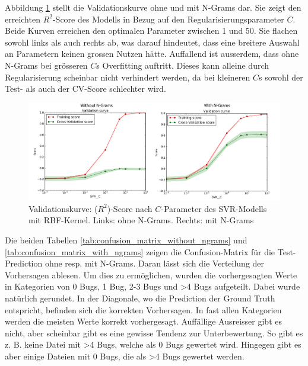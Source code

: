 \documentclass[10pt, a4paper]{article}
\begin{document}
Abbildung \ref{fig:svr_rbf_validation_curves} stellt die Validationskurve ohne und mit N-Grams dar. Sie zeigt den erreichten \(R^2\)-Score des Modells in Bezug auf den Regularisierungsparameter \(C\). Beide Kurven erreichen den optimalen Parameter zwischen 1 und 50. Sie flachen sowohl links als auch rechts ab, was darauf hindeutet, dass eine breitere Auswahl an Parametern keinen grossen Nutzen hätte. Auffallend ist ausserdem, dass ohne N-Grams bei grösseren \(C\)s Overfitting auftritt. Dieses kann alleine durch Regularisierung scheinbar nicht verhindert werden, da bei kleineren \(C\)s sowohl der Test- als auch der \ac{CV}-Score schlechter wird.

\begin{figure}[!ht]
	\centering
	\includegraphics[width=1\textwidth]{resources/images/svr_rbf_validation_curves.png}
	\caption[Validationskurven des SVR-Modells mit RBF-Kernel]{Validationskurve: (\(R^2\))-Score nach \(C\)-Parameter des \newline SVR-Modells mit RBF-Kernel. Links: ohne N-Grams. Rechts: mit N-Grams}
	\label{fig:svr_rbf_validation_curves}
\end{figure}

Die beiden Tabellen \ref{tab:confusion_matrix_without_ngrams} und \ref{tab:confusion_matrix_with_ngrams} zeigen die Confusion-Matrix für die Test-Prediction ohne resp. mit N-Grams. Daran lässt sich die Verteilung der Vorhersagen ablesen. Um dies zu ermöglichen, wurden die vorhergesagten Werte in Kategorien von 0 Bugs, 1 Bug, 2-3 Bugs und \textgreater4 Bugs aufgeteilt. Dabei wurde natürlich gerundet. In der Diagonale, wo die Prediction der Ground Truth entspricht, befinden sich die korrekten Vorhersagen. In fast allen Kategorien werden die meisten Werte korrekt vorhergesagt. Auffällige Ausreisser gibt es nicht, aber scheinbar gibt es eine gewisse Tendenz zur Unterbewertung. So gibt es z. B. keine Datei mit \textgreater4 Bugs, welche als 0 Bugs gewertet wird. Hingegen gibt es aber einige Dateien mit 0 Bugs, die als \textgreater4 Bugs gewertet werden.
\end{document}
